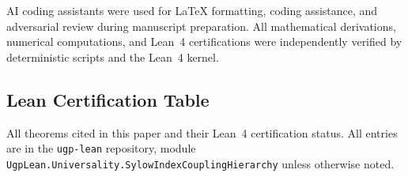 \documentclass[11pt]{article}
\theoremstyle{remark}
\newcommand{\lean}[1]{%
  \penalty-100
  \begingroup\def\_{\textunderscore\allowbreak}\texttt{#1}\endgroup}
\begin{document}
AI coding assistants were used for \LaTeX{} formatting, coding assistance, and adversarial review during manuscript preparation. All mathematical derivations, numerical computations, and Lean~4 certifications were independently verified by deterministic scripts and the Lean~4 kernel.

\begin{appendices}

\section{Lean Certification Table}
\label{app:lean}

All theorems cited in this paper and their Lean~4 certification status.
All entries are in the \texttt{ugp-lean} repository,
module \lean{UgpLean.Universality.SylowIndexCouplingHierarchy}
unless otherwise noted.


\end{appendices}
\end{document}
